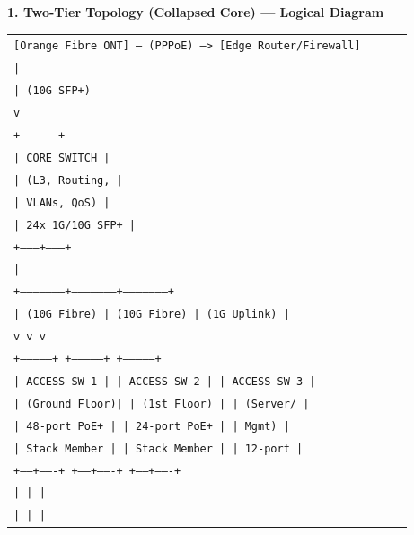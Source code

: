 \documentclass[11pt]{article}
\begin{document}
\begin{exoresolu}
\textbf{1. Two-Tier Topology (Collapsed Core) — Logical Diagram}
\begin{center}
\begin{tabular}{|p{0.9\linewidth}|}\hline
\texttt{[Orange Fibre ONT] --- (PPPoE) ---> [Edge Router/Firewall]}\\
\texttt{\hspace{3.5cm}|}\\
\texttt{\hspace{3.5cm}| (10G SFP+)}\\
\texttt{\hspace{3.5cm}v}\\
\texttt{+------------------+}\\
\texttt{|  CORE SWITCH     |}\\
\texttt{|  (L3, Routing,   |}\\
\texttt{|   VLANs, QoS)    |}\\
\texttt{|  24x 1G/10G SFP+ |}\\
\texttt{+--------+---------+}\\
\texttt{\hspace{1.5cm}|}\\
\texttt{\hspace{0.5cm}+---------------------+---------------------+---------------------+}\\
\texttt{\hspace{0.5cm}| (10G Fibre)         | (10G Fibre)         | (1G Uplink)         |}\\
\texttt{\hspace{0.5cm}v                     v                     v}\\
\texttt{+--------------+      +--------------+      +--------------+}\\
\texttt{| ACCESS SW 1  |      | ACCESS SW 2  |      | ACCESS SW 3  |}\\
\texttt{| (Ground Floor)|      | (1st Floor)  |      | (Server/     |}\\
\texttt{| 48-port PoE+ |      | 24-port PoE+ |      |  Mgmt)       |}\\
\texttt{| Stack Member |      | Stack Member |      | 12-port      |}\\
\texttt{+------+-------+      +------+-------+      +------+-------+}\\
\texttt{\hspace{0.5cm}|                     |                     |}\\
\texttt{\hspace{0.5cm}|                     |                     |}\\

\end{tabular}
\end{center}
\end{exoresolu}
\end{document}

